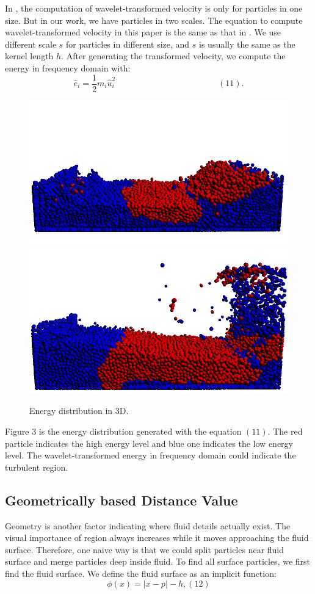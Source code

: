 In \cite{PG2011short:67-72:2011}, the computation of
wavelet-transformed velocity is only for particles in one size.  But in
our work, we have particles in two scales. The equation to compute
wavelet-transformed velocity in this paper is the same as that in
\cite{PG2011short:67-72:2011}. We use different scale $s$ for
particles in different size, and $s$ is usually the same as the kernel
length $h$. After generating the transformed velocity, we compute the
energy in frequency domain with: $$\hat{e}_i=\frac{1}{2}m_i\hat{u}_i^2
\quad \quad \quad \quad \quad \quad \quad \quad \quad \quad \quad
\quad(11).$$

\begin{figure}[htb]
  \centering
  \includegraphics[width=.4\linewidth]{energy-1}
  \includegraphics[width=.4\linewidth]{energy-2}
  \caption{\label{fig:firstExample}
           Energy distribution in 3D.}
\end{figure}

Figure 3 is the energy distribution generated with the equation
$(11)$. The red particle indicates the high energy level and blue one indicates
the low energy level.  The wavelet-transformed energy in frequency domain
could indicate the turbulent region.

\subsection{Geometrically based Distance Value}

Geometry is another factor indicating where fluid details actually
exist. The visual importance of region always increases while it moves
approaching the fluid surface. Therefore, one naive way is that
we could split particles
near fluid surface and merge particles deep inside fluid. To find
all surface particles, we first find the fluid surface. We define
the fluid surface as an implicit function:
$$\phi(x)=|x-p|-h,  (12)$$


